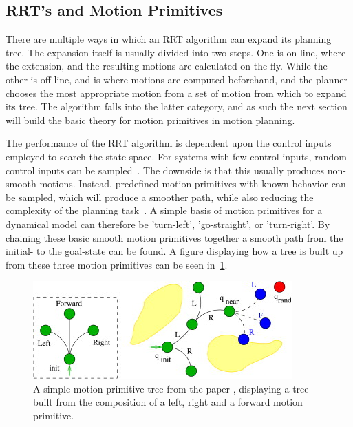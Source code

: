 %   

\subsection{RRT's and Motion Primitives}

There are multiple ways in which an \ac{RRT} algorithm can expand its planning
tree. The expansion itself is usually divided into two steps. One is on-line,
where the extension, and the resulting motions are calculated on the fly. While
the other is off-line, and is where motions are computed beforehand, and the
planner chooses the most appropriate motion from a set of motion from which to
expand its tree. The \rrtfunnel{} algorithm falls into the latter category, and
as such the next section will build the basic theory for motion primitives in
motion planning.

The performance of the \ac{RRT} algorithm is dependent upon the control inputs
employed to search the state-space. For systems with few control inputs, random
control inputs can be sampled~\cite{hauserUsingMotionPrimitives2008}. The
downside is that this usually produces non-smooth motions. Instead, predefined
motion primitives with known behavior can be sampled, which will produce a
smoother path, while also reducing the complexity of the planning
task~\cite{vonasekGlobalMotionPlanning2013}. A simple basis of motion primitives
for a dynamical model can therefore be 'turn-left', 'go-straight', or
'turn-right'. By chaining these basic smooth motion primitives together a smooth
path from the initial- to the goal-state can be found. A figure displaying how a
tree is built up from these three motion primitives can be seen
in~\cref{fig:motion-primitive-tree}.

\begin{figure}
  \centering
  \includegraphics[scale=1]{figures/preliminaries/motion-primitive-tree}
  \caption[A simple motion primitive tree]{A simple motion primitive tree from the paper
    \textcite{vonasekHighlevelMotionPlanning2015}, displaying a tree built from
    the composition of a left, right and a forward motion primitive.}
  \label{fig:motion-primitive-tree}
\end{figure}

